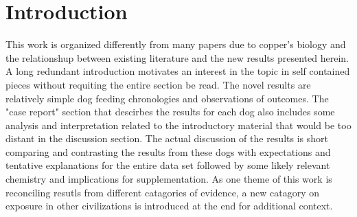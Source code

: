 \section{Introduction  }

This work is organized differently from many papers
due to copper's biology and the relationshup between existing
literature and the new results presented herein.
A long redundant introduction  motivates an interest in the topic
in self contained pieces without requiting the entire section  be read.
The novel results are relatively simple dog feeding chronologies
and observations of outcomes. The "case report" section that
descirbes the results for each dog also includes some analysis
and interpretation related to the   introductory material that would
be too distant in the discussion section. 
The actual discussion of the results is short  comparing 
and contrasting the results
from these dogs with expectations and tentative explanations for
the entire data set  followed by some likely relevant chemistry and 
implications for supplementation. As one theme  of this work is reconciling
resutls from different catagories of evidence, a new catagory 
on exposure in other civilizations is introduced at the end for additional
context.  


\mjmintro



\mjmmislead



\mjmambig


\mjmcubp


\mjmconfuse


\mjmall


\mjmsulfur


\mjmresolve

